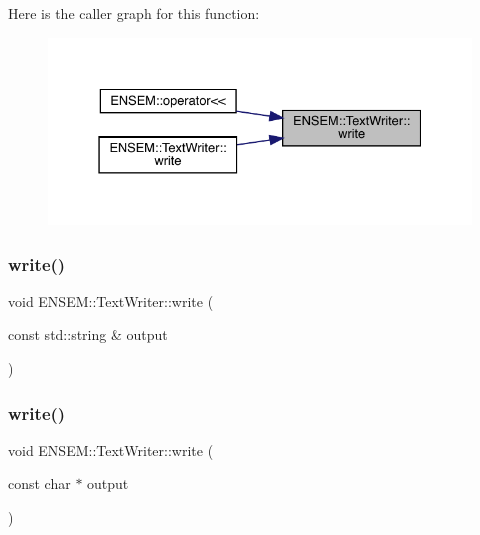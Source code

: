 Here is the caller graph for this function\+:
\nopagebreak
\begin{figure}[H]
\begin{center}
\leavevmode
\includegraphics[width=331pt]{db/d53/classENSEM_1_1TextWriter_a46f85ca8047ad9b0419c1f8e40847b52_icgraph}
\end{center}
\end{figure}
\mbox{\label{classENSEM_1_1TextWriter_a46f85ca8047ad9b0419c1f8e40847b52}} 
\subsubsection{\texorpdfstring{write()}{write()}\hspace{0.1cm}{\footnotesize\ttfamily [3/36]}}
{\footnotesize\ttfamily void E\+N\+S\+E\+M\+::\+Text\+Writer\+::write (\begin{DoxyParamCaption}\item[{const std\+::string \&}]{output }\end{DoxyParamCaption})}

\mbox{\label{classENSEM_1_1TextWriter_ae8a8946f8f52884017f52cd69f809ba2}} 
\subsubsection{\texorpdfstring{write()}{write()}\hspace{0.1cm}{\footnotesize\ttfamily [4/36]}}
{\footnotesize\ttfamily void E\+N\+S\+E\+M\+::\+Text\+Writer\+::write (\begin{DoxyParamCaption}\item[{const char $\ast$}]{output }\end{DoxyParamCaption})}

